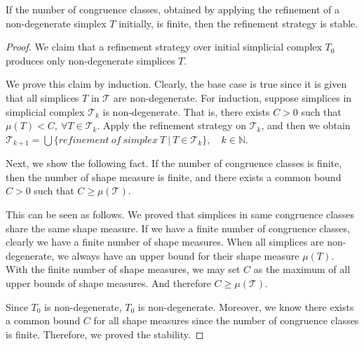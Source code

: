     \begin{theorem*}
    If the number of congruence classes, obtained by applying the refinement of a non-degenerate simplex $T$ initially, is finite, then the refinement strategy is stable.
    \end{theorem*}
    \begin{proof}
    
    We claim that
    a refinement strategy over initial simplicial complex $T_0$ produces only non-degenerate simplices $T$.
    
    We prove this claim by induction.
    Clearly, the base case is true since it is given that all simplices $T$ in $\mathcal{T}$ are non-degenerate. For induction, suppose simplices in simplicial complex $\mathcal{T}_k$ is non-degenerate. That is, there exists $C > 0$ such that $\mu(T) < C, ~\forall T \in\mathcal{T}_k$. Apply the refinement strategy on $\mathcal{T}_k$, and then we obtain $\mathcal{T}_{k+1} = \bigcup\{refinement~of~simplex~T ~\vert ~T\in\mathcal{T}_{k}\}, \quad k\in\mathbb{N}$. 
    
    Next, we show the following fact.
    If the number of congruence classes is finite, then the number of shape measure is finite, and there exists a common bound $C > 0$ such that $C \geq \mu(\mathcal{T})$.
    
    This can be seen as follows.
    We proved that simplices in same congruence classes share the same shape measure. If we have a finite number of congruence classes, clearly we have a finite number of shape measures. When all simplices are non-degenerate, we always have an upper bound for their shape measure $\mu(T)$. With the finite number of shape measures, we may set $C$ as the maximum of all upper bounds of shape measures. And therefore $C \geq \mu(\mathcal{T})$.
    
    Since $T_0$ is non-degenerate, $T_0$ is non-degenerate. Moreover, we know there exists a common bound $C$ for all shape measures since the number of congruence classes is finite. Therefore, we proved the stability.
    \end{proof}
    
    